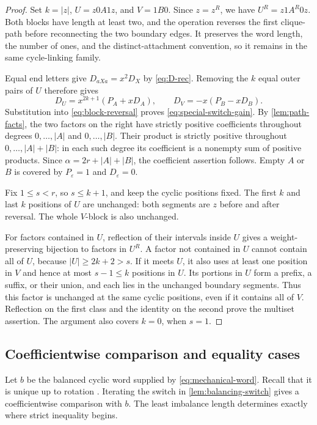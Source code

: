 \documentclass[11pt]{article}
\theoremstyle{definition}
\begin{document}
\begin{proof}
Set $k=|z|$, $U=z0A1z$, and $V=1B0$. Since $z=z^R$, we have
$U^R=z1A^R0z$. Both blocks have length at least two, and the operation
reverses the first clique-path before reconnecting the two boundary
edges. It preserves the word length, the number of ones, and the
distinct-attachment convention, so it remains in the same
cycle-linking family.

Equal end letters give $D_{aXa}=x^2D_X$ by \eqref{eq:D-rec}.
Removing the $k$ equal outer pairs of $U$ therefore gives
\[
 D_U=x^{2k+1}(P_A+xD_A),
 \qquad D_V=-x(P_B-xD_B).
\]
Substitution into \eqref{eq:block-reversal} proves
\eqref{eq:special-switch-gain}. By \cref{lem:path-facts}, the two
factors on the right have strictly positive coefficients throughout
degrees $0,\ldots,|A|$ and $0,\ldots,|B|$. Their product is strictly
positive throughout $0,\ldots,|A|+|B|$: in each such degree its
coefficient is a nonempty sum of positive products. Since
$\alpha=2r+|A|+|B|$, the coefficient assertion follows. Empty $A$ or
$B$ is covered by $P_\varepsilon=1$ and $D_\varepsilon=0$.

Fix $1\le s<r$, so $s\le k+1$, and keep the cyclic positions fixed.
The first $k$ and last $k$ positions of $U$ are unchanged: both
segments are $z$ before and after reversal. The whole $V$-block is
also unchanged.

For factors contained in $U$, reflection of their intervals inside
$U$ gives a weight-preserving bijection to factors in $U^R$.
A factor not contained in $U$ cannot contain all of $U$, because
$|U|\ge2k+2>s$. If it meets $U$, it also uses at least one position
in $V$ and hence at most $s-1\le k$ positions in $U$. Its portions
in $U$ form a prefix, a suffix, or their union, and each lies in the
unchanged boundary segments. Thus this factor is unchanged at the
same cyclic positions, even if it contains all of $V$. Reflection on
the first class and the identity on the second prove the multiset
assertion. The argument also covers $k=0$, when $s=1$.
\end{proof}


\subsection{Coefficientwise comparison and equality cases}

Let $b$ be the balanced cyclic word supplied by
\eqref{eq:mechanical-word}. Recall that it is unique up to rotation
\cite[Proposition~4.4 and the preceding discussion]{DeLucaZamboni2021}.
Iterating the switch in \cref{lem:balancing-switch} gives a
coefficientwise comparison with $b$. The least imbalance length
determines exactly where strict inequality begins.
\end{document}
